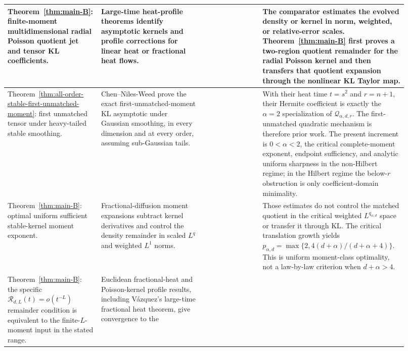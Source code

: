 {\begin{longtable}{>{\raggedright\arraybackslash}p{0.22\linewidth}|%
>{\raggedright\arraybackslash}p{0.24\linewidth}|%
>{\raggedright\arraybackslash}p{0.14\linewidth}|%
>{\raggedright\arraybackslash}p{0.32\linewidth}}
\hline
Theorem~\ref{thm:main-B}: finite-moment multidimensional radial Poisson
quotient jet and tensor KL coefficients.
& Large-time heat-profile theorems identify asymptotic kernels and profile
corrections for linear heat or fractional heat flows.
& \cite{DuoandikoetxeaZuazua1992,EscobedoZuazua1991,
AnkerPapageorgiouZhang2023HeatSymmetricSpaces,
Vazquez2018FractionalHeatEuclidean,
IshigeKawakamiMichihisa2017,
IshigeKawakamiMichihisa2022RefinedFractional}
& The comparator estimates the evolved density or kernel in norm, weighted,
or relative-error scales.  Theorem~\ref{thm:main-B} first proves a
two-region quotient remainder for the radial Poisson kernel and then transfers
that quotient expansion through the nonlinear KL Taylor map.\\
\hline
Theorem~\ref{thm:all-order-stable-first-unmatched-moment}: first unmatched
tensor under heavy-tailed stable smoothing.
& Chen--Niles-Weed prove the exact first-unmatched-moment KL asymptotic under
Gaussian smoothing, in every dimension and at every order, assuming
sub-Gaussian tails.
& \cite[Theorem~2.5]{ChenNilesWeed2022SmoothedWasserstein}
& With their heat time \(t=s^2\) and \(r=n+1\), their Hermite coefficient is
exactly the \(\alpha=2\) specialization of \(\mathcal Q_{\alpha,d,r}\).
The first-unmatched quadratic mechanism is therefore prior work.  The present
increment is \(0<\alpha<2\), the critical complete-moment exponent, endpoint
sufficiency, and analytic uniform sharpness in the non-Hilbert regime; in the
Hilbert regime the below-\(r\) obstruction is only coefficient-domain
minimality.\\
\hline
Theorem~\ref{thm:main-B}: optimal uniform sufficient stable-kernel moment
exponent.
& Fractional-diffusion moment expansions subtract kernel derivatives and
control the density remainder in scaled \(L^q\) and weighted \(L^1\) norms.
& \cite{IshigeKawakamiMichihisa2017,
IshigeKawakamiMichihisa2022RefinedFractional}
& Those estimates do not control the matched quotient in the critical
weighted \(L^{q_{\alpha,d}}\) space or transfer it through KL.  The critical
translation growth yields
\(p_{\alpha,d}=\max\{2,4(d+\alpha)/(d+\alpha+4)\}\).  This is uniform
moment-class optimality, not a law-by-law criterion when \(d+\alpha>4\).\\
\hline
Theorem~\ref{thm:main-B}: the specific
\(\mathcal R_{d,L}(t)=o(t^{-L})\) remainder condition is equivalent to the
finite-\(L\)-moment input in the stated range.
& Euclidean fractional-heat and Poisson-kernel profile results, including
V{\'a}zquez's large-time fractional heat theorem, give convergence to the

\end{longtable}}
